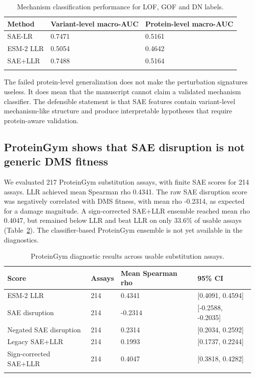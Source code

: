 \documentclass[pdflatex,sn-nature]{sn-jnl}
\begin{document}
\begin{table}[h]
\caption{Mechanism classification performance for LOF, GOF and DN labels.}\label{tab:mechanism}
\begin{tabular}{@{}lll@{}}
\toprule
Method & Variant-level macro-AUC & Protein-level macro-AUC \\
\midrule
SAE-LR & 0.7471 & 0.5161 \\
ESM-2 LLR & 0.5054 & 0.4642 \\
SAE+LLR & 0.7488 & 0.5164 \\
\botrule
\end{tabular}
\end{table}

The failed protein-level generalization does not make the perturbation signatures useless. It does mean that the manuscript cannot claim a validated mechanism classifier. The defensible statement is that SAE features contain variant-level mechanism-like structure and produce interpretable hypotheses that require protein-aware validation.

\subsection{ProteinGym shows that SAE disruption is not generic DMS fitness}

We evaluated 217 ProteinGym substitution assays, with finite SAE scores for 214 assays. LLR achieved mean Spearman rho 0.4341. The raw SAE disruption score was negatively correlated with DMS fitness, with mean rho -0.2314, as expected for a damage magnitude. A sign-corrected SAE+LLR ensemble reached mean rho 0.4047, but remained below LLR and beat LLR on only 33.6\% of usable assays (Table~\ref{tab:proteingym}). The classifier-based ProteinGym ensemble is not yet available in the diagnostics.

\begin{table}[h]
\caption{ProteinGym diagnostic results across usable substitution assays.}\label{tab:proteingym}
\begin{tabular}{@{}llll@{}}
\toprule
Score & Assays & Mean Spearman rho & 95\% CI \\
\midrule
ESM-2 LLR & 214 & 0.4341 & [0.4091, 0.4594] \\
SAE disruption & 214 & -0.2314 & [-0.2588, -0.2035] \\
Negated SAE disruption & 214 & 0.2314 & [0.2034, 0.2592] \\
Legacy SAE+LLR & 214 & 0.1993 & [0.1737, 0.2244] \\
Sign-corrected SAE+LLR & 214 & 0.4047 & [0.3818, 0.4282] \\
\botrule
\end{tabular}
\end{table}
\end{document}
